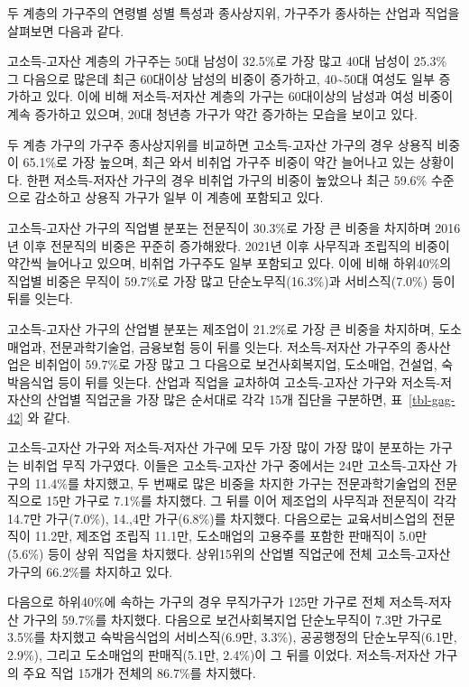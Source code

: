 \documentclass[
  letterpaper,
  DIV=11,
  numbers=noendperiod]{scrartcl}
\begin{document}
두 계층의 가구주의 연령별 성별 특성과 종사상지위, 가구주가 종사하는
산업과 직업을 살펴보면 다음과 같다.

고소득-고자산 계층의 가구주는 50대 남성이 32.5\%로 가장 많고 40대 남성이
25.3\% 그 다음으로 많은데 최근 60대이상 남성의 비중이 증가하고,
40\textasciitilde50대 여성도 일부 증가하고 있다. 이에 비해 저소득-저자산
계층의 가구는 60대이상의 남성과 여성 비중이 계속 증가하고 있으며, 20대
청년층 가구가 약간 증가하는 모습을 보이고 있다.

두 계층 가구의 가구주 종사상지위를 비교하면 고소득-고자산 가구의 경우
상용직 비중이 65.1\%로 가장 높으며, 최근 와서 비취업 가구주 비중이 약간
늘어나고 있는 상황이다. 한편 저소득-저자산 가구의 경우 비취업 가구의
비중이 높았으나 최근 59.6\% 수준으로 감소하고 상용직 가구가 일부 이
계층에 포함되고 있다.

고소득-고자산 가구의 직업별 분포는 전문직이 30.3\%로 가장 큰 비중을
차지하며 2016년 이후 전문직의 비중은 꾸준히 증가해왔다. 2021년 이후
사무직과 조립직의 비중이 약간씩 늘어나고 있으며, 비취업 가구주도 일부
포함되고 있다. 이에 비해 하위40\%의 직업별 비중은 무직이 59.7\%로 가장
많고 단순노무직(16.3\%)과 서비스직(7.0\%) 등이 뒤를 잇는다.

고소득-고자산 가구의 산업별 분포는 제조업이 21.2\%로 가장 큰 비중을
차지하며, 도소매업과, 전문과학기술업, 금융보험 등이 뒤를 잇는다.
저소득-저자산 가구주의 종사산업은 비취업이 59.7\%로 가장 많고 그
다음으로 보건사회복지업, 도소매업, 건설업, 숙박음식업 등이 뒤를 잇는다.
산업과 직업을 교차하여 고소득-고자산 가구와 저소득-저자산의 산업별
직업군을 가장 많은 순서대로 각각 15개 집단을 구분하면,
표~\ref{tbl-gag-42} 와 같다.

고소득-고자산 가구와 저소득-저자산 가구에 모두 가장 많이 가장 많이
분포하는 가구는 비취업 무직 가구였다. 이들은 고소득-고자산 가구 중에서는
24만 고소득-고자산 가구의 11.4\%를 차지했고, 두 번째로 많은 비중을
차지한 가구는 전문과학기술업의 전문직으로 15만 가구로 7.1\%를 차지했다.
그 뒤를 이어 제조업의 사무직과 전문직이 각각 14.7만 가구(7.0\%), 14.,4만
가구(6.8\%)를 차지했다. 다음으로는 교육서비스업의 전문직이 11.2만,
제조업 조립직 11.1만, 도소매업의 고용주를 포함한 판매직이 5.0만(5.6\%)
등이 상위 직업을 차지했다. 상위15위의 산업별 직업군에 전체 고소득-고자산
가구의 66.2\%를 차지하고 있다.

다음으로 하위40\%에 속하는 가구의 경우 무직가구가 125만 가구로 전체
저소득-저자산 가구의 59.7\%를 차지했다. 다음으로 보건사회복지업
단순노무직이 7.3만 가구로 3.5\%를 차지했고 숙박음식업의 서비스직(6.9만,
3.3\%), 공공행정의 단순노무직(6.1만, 2.9\%), 그리고 도소매업의
판매직(5.1만, 2.4\%)이 그 뒤를 이었다. 저소득-저자산 가구의 주요 직업
15개가 전체의 86.7\%를 차지했다.
\end{document}
